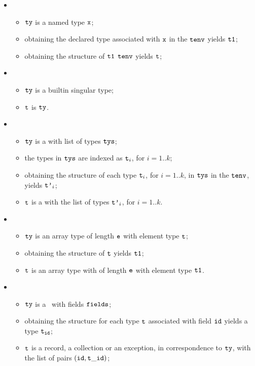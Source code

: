 \ProseParagraph
\OneApplies
\begin{itemize}
\item {}
  \begin{itemize}
  \item $\texttt{ty}$ is a named type $\texttt{x}$;
  \item obtaining the declared type associated with $\texttt{x}$ in the \staticenvironmentterm{} $\texttt{tenv}$ yields $\texttt{t1}$\ProseOrTypeError;
  \item obtaining the structure of $\texttt{t1}$ \staticenvironmentterm{} $\texttt{tenv}$ yields $\texttt{t}$\ProseOrTypeError;
  \end{itemize}
\item {}
  \begin{itemize}
  \item $\texttt{ty}$ is a builtin singular type;
  \item $\texttt{t}$ is $\texttt{ty}$.
  \end{itemize}
\item {}
  \begin{itemize}
  \item $\texttt{ty}$ is a \tupletypeterm{} with list of types $\texttt{tys}$;
  \item the types in $\texttt{tys}$ are indexed as $\texttt{t}_i$, for $i=1..k$;
  \item obtaining the structure of each type $\texttt{t}_i$, for $i=1..k$, in $\texttt{tys}$ in the \staticenvironmentterm{} $\texttt{tenv}$,
  yields $\texttt{t'}_i$\ProseOrTypeError;
  \item $\texttt{t}$ is a \tupletypeterm{} with the list of types $\texttt{t'}_i$, for $i=1..k$.
  \end{itemize}
\item {}
  \begin{itemize}
    \item $\texttt{ty}$ is an array type of length $\texttt{e}$ with element type $\texttt{t}$;
    \item obtaining the structure of $\texttt{t}$ yields $\texttt{t1}$\ProseOrTypeError;
    \item $\texttt{t}$ is an array type with of length $\texttt{e}$ with element type $\texttt{t1}$.
  \end{itemize}
\item {}
  \begin{itemize}
  \item $\texttt{ty}$ is a \structuredtype\ with fields $\texttt{fields}$;
  \item obtaining the structure for each type $\texttt{t}$ associated with field $\texttt{id}$ yields a type $\texttt{t}_{\texttt{id}}$\ProseOrTypeError;
  \item $\texttt{t}$ is a record, a collection or an exception, in correspondence to $\texttt{ty}$, with the list of pairs $(\texttt{id}, \texttt{t}\_\texttt{id})$;
  \end{itemize}
\end{itemize}

